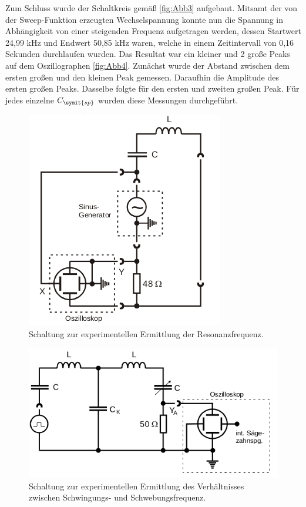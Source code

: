 Zum Schluss wurde der Schaltkreis gemäß \autoref{fig:Abb3} aufgebaut. Mitsamt der von der Sweep-Funktion erzeugten Wechselspannung konnte nun die Spannung in Abhängigkeit von einer steigenden Frequenz aufgetragen werden, dessen Startwert 24,99 kHz und Endwert 50,85 kHz waren, welche in einem Zeitintervall von 0,16 Sekunden durchlaufen wurden. Das Resultat war ein kleiner und 2 große Peaks auf dem Oszillographen \autoref{fig:Abb4}. Zunächst wurde der Abstand zwischen dem ersten großen und den kleinen Peak gemessen. Daraufhin die Amplitude des ersten großen Peaks. Dasselbe folgte für den ersten und zweiten großen Peak. Für jedes einzelne \(C_{\symit{sp}}\) wurden diese Messungen durchgeführt.

\begin{figure}
    \centering
    \includegraphics[scale=0.7]{content/Bilder/Test.png}
    \caption{Schaltung zur experimentellen Ermittlung der Resonanzfrequenz.}
    \label{fig:Abb1}
    \end{figure}
    \begin{figure}
        \centering
        \includegraphics[scale=0.7]{content/Bilder/a_b.png}
        \caption{Schaltung zur experimentellen Ermittlung des Verhältnisses zwischen Schwingungs- und Schwebungsfrequenz.}
        \label{fig:Abb2}
        \end{figure}
